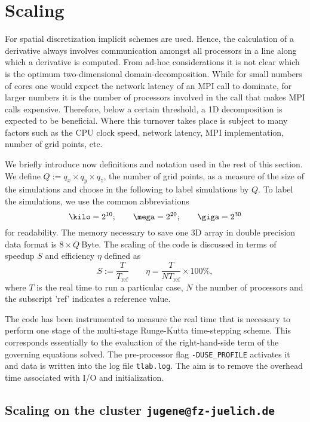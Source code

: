 \chapter{Scaling}\label{sec:scaling}

For spatial discretization implicit schemes are used. Hence, the calculation of
a derivative always involves communication amongst all processors in a line
along which a derivative is computed. From ad-hoc considerations it is not clear
which is the optimum two-dimensional domain-decomposition.  While for small
numbers of cores one would expect the network latency of an MPI call to
dominate, for larger numbers it is the number of processors involved in the call
that makes MPI calls expensive. Therefore, below a certain threshold, a 1D
decomposition is expected to be beneficial. Where this turnover takes place is
subject to many factors such as the CPU clock speed, network latency, MPI
implementation, number of grid points, etc.

We briefly introduce now definitions and notation used in the rest of this
section. We define $Q:=q_x\times q_y \times q_z$, the number of grid points, as
a measure of the size of the simulations and choose in the following to label
simulations by $Q$. To label the simulations, we use the common abbreviations
\begin{equation}
\kilo=2^{10};\qquad\mega=2^{20};\qquad\giga=2^{30}
\end{equation}
for readability. The memory necessary to save one 3D array in double precision
data format is $8\times Q~\mathrm{Byte}$.  The scaling of the code is discussed
in terms of speedup $S$ and efficiency $\eta$ defined as
\begin{equation}
 S:=\frac{T}{T_\mathrm{ref}}\qquad \eta = \frac{T}{NT_\mathrm{ref}} \times 100\%,
\end{equation}
where $T$ is the real time to run a particular case, $N$ the number of
processors and the subscript 'ref' indicates a reference value.

The code has been instrumented to measure the real time that is necessary to
perform one stage of the multi-stage Runge-Kutta time-stepping scheme.  This
corresponds essentially to the evaluation of the right-hand-side term of the
governing equations solved. The pre-processor flag \verb,-DUSE_PROFILE,
activates it and data is written into the log file \verb,tlab.log,. The aim is to
remove the overhead time associated with I/O and initialization.

\section{Scaling on the cluster \texttt{jugene@fz-juelich.de}}

